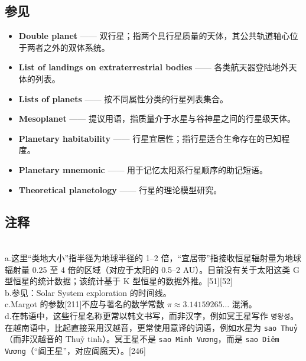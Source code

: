 \subsection{参见}
\begin{itemize}
\item \textbf{Double planet} —— 双行星；指两个具行星质量的天体，其公共轨道轴心位于两者之外的双体系统。
\item \textbf{List of landings on extraterrestrial bodies} —— 各类航天器登陆地外天体的列表。
\item \textbf{Lists of planets} —— 按不同属性分类的行星列表集合。
\item \textbf{Mesoplanet} —— 提议用语，指质量介于水星与谷神星之间的行星级天体。
\item \textbf{Planetary habitability} —— 行星宜居性；指行星适合生命存在的已知程度。
\item \textbf{Planetary mnemonic} —— 用于记忆太阳系行星顺序的助记短语。
\item \textbf{Theoretical planetology} —— 行星的理论模型研究。
\end{itemize}
\subsection{注释}\\
a.这里“类地大小”指半径为地球半径的 1–2 倍，“宜居带”指接收恒星辐射量为地球辐射量 0.25 至 4 倍的区域（对应于太阳的 0.5–2 AU）。目前没有关于太阳这类 G 型恒星的统计数据；该统计基于 K 型恒星的数据外推。[51][52]\\
b.参见：Solar System exploration 的时间线。\\
c.Margot 的参数[211]不应与著名的数学常数 $\pi\approx 3.14159265\ldots$ 混淆。\\
d.在韩语中，这些行星名称更常以韩文书写，而非汉字，例如冥王星写作 \texttt{명왕성}。在越南语中，比起直接采用汉越音，更常使用意译的词语，例如水星为 \texttt{sao Thuỷ}（而非汉越音的 Thuỷ tinh）。冥王星不是 \texttt{sao Minh Vương}，而是 \texttt{sao Diêm Vương}（“阎王星”，对应阎魔天）。[246]









